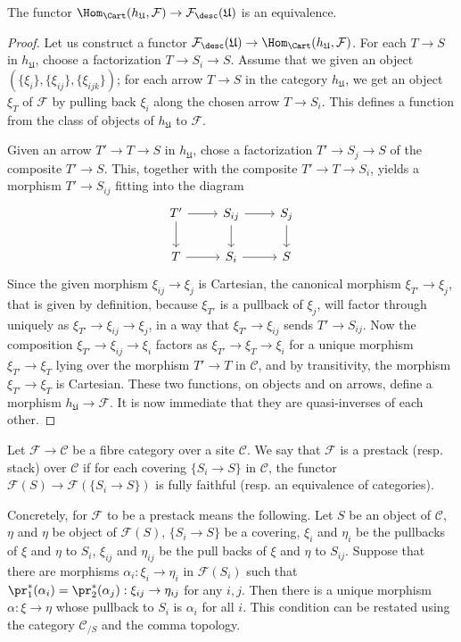 \begin{proposition}\label{descent Hom cat and descent cat equivalence}
The functor $\Hom_{\Cart}(h_\mathfrak{U},\mathcal{F})\to\mathcal{F}_{\desc}(\mathfrak{U})$ is an equivalence.
\end{proposition}
\begin{proof}
Let us construct a functor $\mathcal{F}_{\desc}(\mathfrak{U})\to \Hom_{\Cart}(h_\mathfrak{U},\mathcal{F})$. For each $T\to S$ in $h_\mathfrak{U}$, choose a factorization $T\to S_i\to S$. Assume that we given an object $(\{\xi_i\},\{\xi_{ij}\},\{\xi_{ijk}\})$; for each arrow $T\to S$ in the category $h_\mathfrak{U}$, we get an object $\xi_T$ of $\mathcal{F}$ by pulling back $\xi_i$ along the chosen arrow $T\to S_i$. This defines a function from the class of objects of $h_\mathfrak{U}$ to $\mathcal{F}$.\par
Given an arrow $T'\to T\to S$ in $h_\mathfrak{U}$, chose a factorization $T'\to S_j\to S$ of the composite $T'\to S$. This, together with the composite $T'\to T\to S_i$, yields a morphism $T'\to S_{ij}$ fitting into the diagram
\[\begin{tikzcd}
T'\ar[r]\ar[d]&S_{ij}\ar[r]\ar[d]&S_j\ar[d]\\
T\ar[r]&S_i\ar[r]&S
\end{tikzcd}\]
Since the given morphism $\xi_{ij}\to\xi_j$ is Cartesian, the canonical morphism $\xi_{T'}\to\xi_j$, that is given by definition, because $\xi_{T'}$ is a pullback of $\xi_j$, will factor through uniquely as $\xi_{T'}\to\xi_{ij}\to\xi_j$, in a way that $\xi_{T'}\to\xi_{ij}$ sends $T'\to S_{ij}$. Now the composition $\xi_{T'}\to\xi_{ij}\to\xi_i$ factors as $\xi_{T'}\to\xi_T\to\xi_i$ for a unique morphism $\xi_{T'}\to\xi_T$ lying over the morphism $T'\to T$ in $\mathcal{C}$, and by transitivity, the morphism $\xi_{T'}\to\xi_T$ is Cartesian. These two functions, on objects and on arrows, define a morphism $h_\mathfrak{U}\to\mathcal{F}$. It is now immediate that they are quasi-inverses of each other. 
\end{proof}

Let $\mathcal{F}\to\mathcal{C}$ be a fibre category over a site $\mathcal{C}$. We say that $\mathcal{F}$ is a prestack (resp. stack) over $\mathcal{C}$ if for each covering $\{S_i\to S\}$ in $\mathcal{C}$, the functor $\mathcal{F}(S)\to \mathcal{F}(\{S_i\to S\})$ is fully faithful (resp. an equivalence of categories).\par
Concretely, for $\mathcal{F}$ to be a prestack means the following. Let $S$ be an object of $\mathcal{C}$, $\eta$ and $\eta$ be object of $\mathcal{F}(S)$, $\{S_i\to S\}$ be a covering, $\xi_i$ and $\eta_i$ be the pullbacks of $\xi$ and $\eta$ to $S_i$, $\xi_{ij}$ and $\eta_{ij}$ be the pull backs of $\xi$ and $\eta$ to $S_{ij}$. Suppose that there are morphisms $\alpha_i:\xi_i\to\eta_i$ in $\mathcal{F}(S_i)$ such that $\pr_1^*(\alpha_i)=\pr_2^*(\alpha_j):\xi_{ij}\to\eta_{ij}$ for any $i,j$. Then there is a unique morphism $\alpha:\xi\to\eta$ whose pullback to $S_i$ is $\alpha_i$ for all $i$. This condition can be restated using the category $\mathcal{C}_{/S}$ and the comma topology.

